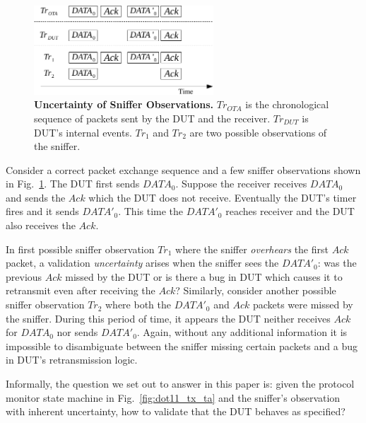 \begin{figure}[h!]
  \centering
  \includegraphics[width=0.6\textwidth]{./figures/false_pos.pdf}
  \caption{\textbf{Uncertainty of Sniffer Observations.} $Tr_{OTA}$ is
    the chronological sequence of packets sent by the DUT and the receiver.
    $Tr_{DUT}$ is DUT's internal events. $Tr_1$ and $Tr_2$ are two possible observations
  of the sniffer.}
  \label{fig:sniffer_in_middle}
\end{figure}

Consider a correct packet exchange sequence and a few sniffer observations
shown in Fig.~\ref{fig:sniffer_in_middle}. The DUT first sends
$DATA_0$.  Suppose the receiver receives $DATA_0$ and sends the $Ack$ which the
DUT does not receive. Eventually the DUT's timer fires and it sends $DATA'_0$.
This time the $DATA'_0$ reaches receiver and the DUT also receives the $Ack$.

In first possible sniffer observation $Tr_1$ where the sniffer \textit{overhears} the
first $Ack$ packet, a validation \textit{uncertainty} arises when the sniffer
sees the $DATA'_0$: was the previous $Ack$ missed by the
DUT or is there a bug in DUT which causes it to retransmit even after receiving
the $Ack$?
Similarly, consider another possible sniffer observation
$Tr_2$ where both the $DATA'_0$ and $Ack$ packets were missed by the sniffer.
During this period of time, it appears the DUT neither receives $Ack$
for $DATA_0$ nor sends $DATA'_0$.
Again, without any additional information it is impossible to disambiguate between the
sniffer missing certain packets and a bug in DUT's retransmission logic.

Informally, the question we set out to answer in this paper is: given the
protocol monitor state machine in Fig.~\ref{fig:dot11_tx_ta} and the sniffer's
observation with inherent uncertainty, how to validate that the DUT behaves as
specified?
